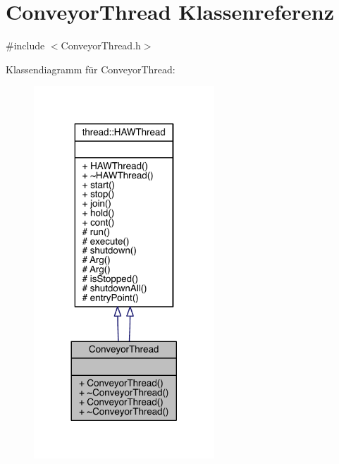 \hypertarget{class_conveyor_thread}{}\section{Conveyor\+Thread Klassenreferenz}
\label{class_conveyor_thread}


{\ttfamily \#include $<$Conveyor\+Thread.\+h$>$}



Klassendiagramm für Conveyor\+Thread\+:\nopagebreak
\begin{figure}[H]
\begin{center}
\leavevmode
\includegraphics[width=192pt]{class_conveyor_thread__inherit__graph}
\end{center}
\end{figure}


